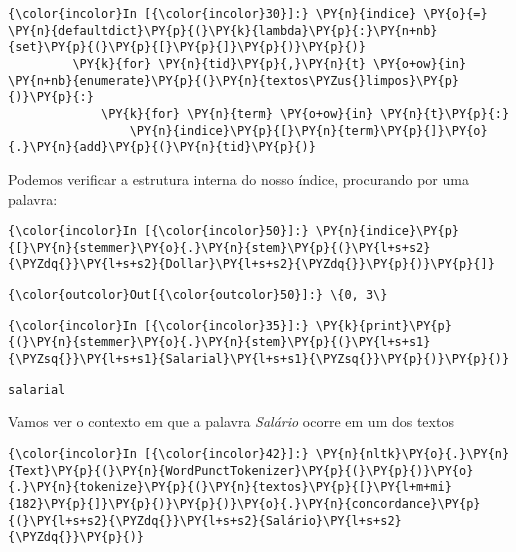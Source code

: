     \begin{Verbatim}[commandchars=\\\{\}]
{\color{incolor}In [{\color{incolor}30}]:} \PY{n}{indice} \PY{o}{=} \PY{n}{defaultdict}\PY{p}{(}\PY{k}{lambda}\PY{p}{:}\PY{n+nb}{set}\PY{p}{(}\PY{p}{[}\PY{p}{]}\PY{p}{)}\PY{p}{)}
         \PY{k}{for} \PY{n}{tid}\PY{p}{,}\PY{n}{t} \PY{o+ow}{in} \PY{n+nb}{enumerate}\PY{p}{(}\PY{n}{textos\PYZus{}limpos}\PY{p}{)}\PY{p}{:}
             \PY{k}{for} \PY{n}{term} \PY{o+ow}{in} \PY{n}{t}\PY{p}{:}
                 \PY{n}{indice}\PY{p}{[}\PY{n}{term}\PY{p}{]}\PY{o}{.}\PY{n}{add}\PY{p}{(}\PY{n}{tid}\PY{p}{)}
\end{Verbatim}

    Podemos verificar a estrutura interna do nosso índice, procurando por
uma palavra:

    \begin{Verbatim}[commandchars=\\\{\}]
{\color{incolor}In [{\color{incolor}50}]:} \PY{n}{indice}\PY{p}{[}\PY{n}{stemmer}\PY{o}{.}\PY{n}{stem}\PY{p}{(}\PY{l+s+s2}{\PYZdq{}}\PY{l+s+s2}{Dollar}\PY{l+s+s2}{\PYZdq{}}\PY{p}{)}\PY{p}{]}
\end{Verbatim}

            \begin{Verbatim}[commandchars=\\\{\}]
{\color{outcolor}Out[{\color{outcolor}50}]:} \{0, 3\}
\end{Verbatim}
        
    \begin{Verbatim}[commandchars=\\\{\}]
{\color{incolor}In [{\color{incolor}35}]:} \PY{k}{print}\PY{p}{(}\PY{n}{stemmer}\PY{o}{.}\PY{n}{stem}\PY{p}{(}\PY{l+s+s1}{\PYZsq{}}\PY{l+s+s1}{Salarial}\PY{l+s+s1}{\PYZsq{}}\PY{p}{)}\PY{p}{)}
\end{Verbatim}

    \begin{Verbatim}[commandchars=\\\{\}]
salarial

    \end{Verbatim}

    Vamos ver o contexto em que a palavra \emph{Salário} ocorre em um dos
textos

    \begin{Verbatim}[commandchars=\\\{\}]
{\color{incolor}In [{\color{incolor}42}]:} \PY{n}{nltk}\PY{o}{.}\PY{n}{Text}\PY{p}{(}\PY{n}{WordPunctTokenizer}\PY{p}{(}\PY{p}{)}\PY{o}{.}\PY{n}{tokenize}\PY{p}{(}\PY{n}{textos}\PY{p}{[}\PY{l+m+mi}{182}\PY{p}{]}\PY{p}{)}\PY{p}{)}\PY{o}{.}\PY{n}{concordance}\PY{p}{(}\PY{l+s+s2}{\PYZdq{}}\PY{l+s+s2}{Salário}\PY{l+s+s2}{\PYZdq{}}\PY{p}{)}
\end{Verbatim}


